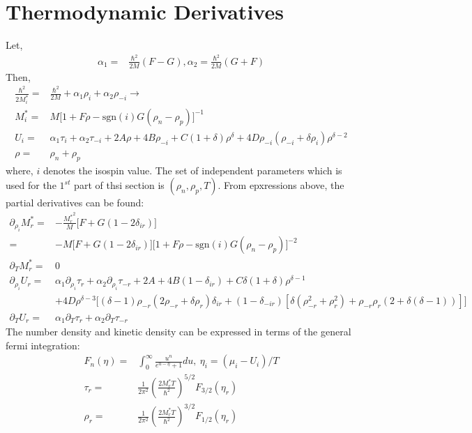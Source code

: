 \documentclass[preprint,prc,preprintnumbers,superscriptaddress,amsmath,amssymb,floatfix]{revtex4-1}
\begin{document}
\section{Thermodynamic Derivatives}
Let,
\begin{equation}
 \begin{split}
  \alpha_1=&\frac{\hbar^2}{2M}(F-G), \alpha_2 =\frac{\hbar^2}{2M} (G+F)
  \end{split}
\end{equation}
Then,
\begin{equation}
 \begin{split}
  \frac{\hbar^2}{2 M^{*}_i}=&\frac{\hbar^2}{2 M}+\alpha_1 \rho_i+\alpha_2 \rho_{-i}\rightarrow\\
  M^{*}_i=&M \big[1+F \rho- \text{sgn}(i) G (\rho_n-\rho_p)\big]^{-1}\\
  U_i=&\alpha_1 \tau_i+\alpha_2 \tau_{-i}+2A \rho + 4 B \rho_{-i}+ C(1+\delta)\rho^{\delta}+4 D \rho_{-i}(\rho_{-i}+\delta \rho_i)\rho^{\delta-2}\\
  \rho=&\rho_n+\rho_p
 \end{split}
\end{equation}
where, $i$ denotes the isospin value. The set of independent parameters which is used for the $1^{st}$ part of thsi section is $(\rho_n,\rho_p,T)$.
From epxressions above, the partial derivatives can be found:
\begin{equation}
 \begin{split}
  \partial_{\rho_i}M^{*}_r=&-\frac{{M_r^{*}}^2}{M}\big[F+G(1-2\delta_{ir})\big]\\
  =&-M \big[F+G(1-2\delta_{ir})\big]\big[1+F \rho- \text{sgn}(i) G (\rho_n-\rho_p)\big]^{-2}\\
  \partial_{T}M^{*}_r =& 0\\
  \partial_{\rho_i}U_r=& \alpha_1 \partial_{\rho_i}\tau_r+\alpha_2 \partial_{\rho_i}\tau_{-r} + 2 A + 4 B (1-\delta_{ir}) + C \delta (1+\delta)\rho^{\delta-1}\\
  &+4 D \rho^{\delta-3} \big[(\delta-1)\rho_{-r}(2\rho_{-r}+\delta \rho_r)\delta_{ir}+(1-\delta_{-ir})[\delta (\rho_{-r}^2+\rho_{r}^2)+\rho_{-r}\rho_{r}(2+\delta(\delta-1))]\big]\\
  \partial_{T}U_r =& \alpha_1 \partial_{T}\tau_r+\alpha_2 \partial_{T}\tau_{-r}
 \end{split}
\end{equation}
The number density and kinetic density can be expressed in terms of the general fermi integration:
\begin{equation}
 \begin{split}
  F_n(\eta)=&\int_0^{\infty}\frac{u^n}{e^{u-\eta}+1}du,\ \eta_i=(\mu_i-U_i)/T\\
  \tau_r=&\frac{1}{2\pi^2}(\frac{2M^{*}_rT}{\hbar^2})^{5/2}F_{3/2}(\eta_r)\\
  \rho_r=&\frac{1}{2\pi^2}(\frac{2M_r^{*}T}{\hbar^2})^{3/2}F_{1/2}(\eta_r)\\
 \end{split}
\end{equation}
\end{document}
